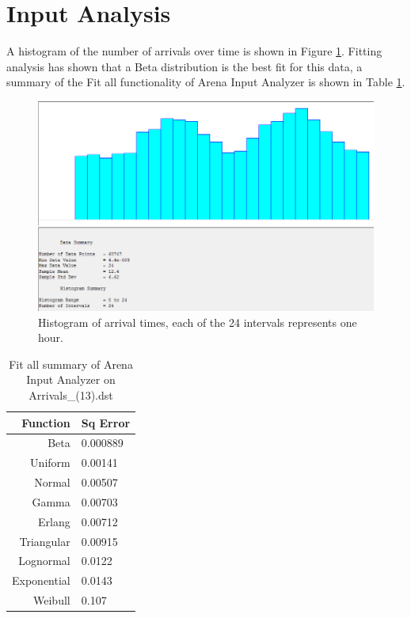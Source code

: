 \section{Input Analysis}
A histogram of the number of arrivals over time is shown in Figure \ref{fig:histogram-arrivals}. 
Fitting analysis has shown that a Beta distribution is the best fit for this data, a summary of the Fit all functionality of Arena Input Analyzer is shown in Table \ref{tab:fitallarrivals}.

\begin{figure}[h]
	\includegraphics[width=\textwidth]{images/histogram-arrivals.PNG}
	\caption{Histogram of arrival times, each of the 24 intervals represents one hour.}
	\label{fig:histogram-arrivals}
\end{figure}

\begin{table}[h]
	\centering
	\begin{tabular}{r | l}
		Function  &     Sq Error\\
		\hline
		Beta       &  0.000889\\
		Uniform     & 0.00141\\
		Normal       &0.00507\\
		Gamma        &0.00703\\
		Erlang       &0.00712\\
		Triangular   &0.00915\\
		Lognormal    &0.0122\\
		Exponential  &0.0143\\
		Weibull      &0.107	
	\end{tabular}
	\caption{Fit all summary of Arena Input Analyzer on Arrivals\_(13).dst}
	\label{tab:fitallarrivals}
\end{table}

